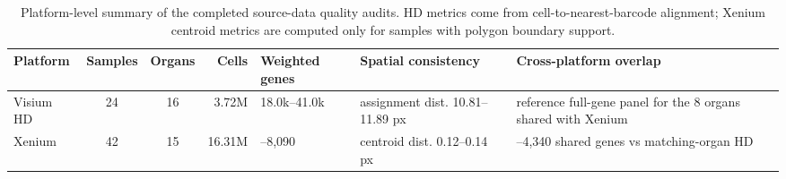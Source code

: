 \documentclass[sigconf,review]{acmart}
\begin{document}
\begin{table}[t]
\centering
\scriptsize
\setlength{\tabcolsep}{3.2pt}
\caption{Platform-level summary of the completed source-data quality audits. HD metrics come from cell-to-nearest-barcode alignment; Xenium centroid metrics are computed only for samples with polygon boundary support.}
\label{tab:platform_qc_summary}
\begin{tabularx}{\textwidth}{
l c c r
>{\raggedright\arraybackslash}p{2.6cm}
>{\raggedright\arraybackslash}p{3.2cm}
>{\raggedright\arraybackslash}X}
\toprule
\textbf{Platform} & \textbf{Samples} & \textbf{Organs} & \textbf{Cells} & \textbf{Weighted genes} & \textbf{Spatial consistency} & \textbf{Cross-platform overlap} \\
\midrule
Visium HD & 24 & 16 & 3.72M & 18.0k--41.0k & assignment dist. 10.81--11.89 px & reference full-gene panel for the 8 organs shared with Xenium \\
Xenium & 42 & 15 & 16.31M & 484--8,090 & centroid dist. 0.12--0.14 px & 368--4,340 shared genes vs matching-organ HD \\
\bottomrule
\end{tabularx}
\end{table}
\end{document}
